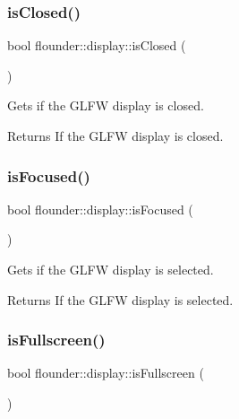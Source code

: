 \subsubsection{\texorpdfstring{is\+Closed()}{isClosed()}}
{\footnotesize\ttfamily bool flounder\+::display\+::is\+Closed (\begin{DoxyParamCaption}{ }\end{DoxyParamCaption})}



Gets if the G\+L\+FW display is closed. 

\begin{DoxyReturn}{Returns}
If the G\+L\+FW display is closed. 
\end{DoxyReturn}
\mbox{\label{classflounder_1_1display_a57dbf90706399fb0511b50740a1b77da}} 
\subsubsection{\texorpdfstring{is\+Focused()}{isFocused()}}
{\footnotesize\ttfamily bool flounder\+::display\+::is\+Focused (\begin{DoxyParamCaption}{ }\end{DoxyParamCaption})}



Gets if the G\+L\+FW display is selected. 

\begin{DoxyReturn}{Returns}
If the G\+L\+FW display is selected. 
\end{DoxyReturn}
\mbox{\label{classflounder_1_1display_ad9a50aad9e26ea3f3a074d1dbe19c58a}} 
\subsubsection{\texorpdfstring{is\+Fullscreen()}{isFullscreen()}}
{\footnotesize\ttfamily bool flounder\+::display\+::is\+Fullscreen (\begin{DoxyParamCaption}{ }\end{DoxyParamCaption})}



